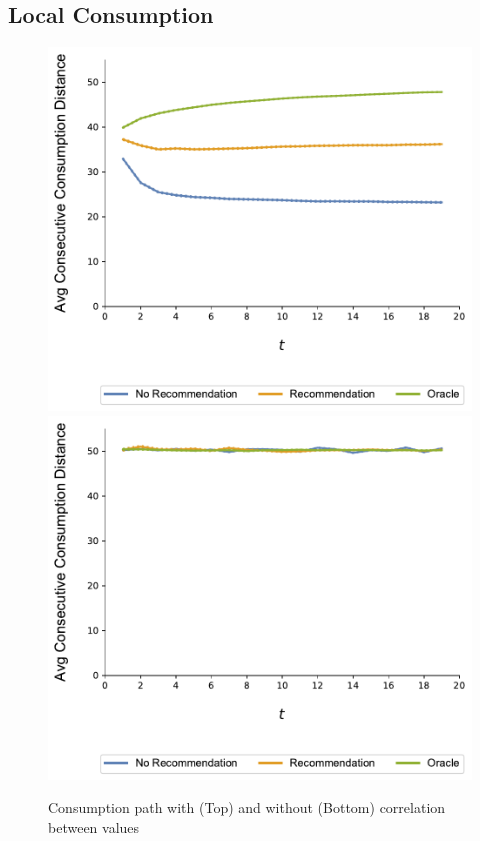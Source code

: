 \documentclass[sigconf]{acmart}
\begin{document}
\subsection{Local Consumption}
\begin{figure}
\includegraphics[width=.9\linewidth]{figures/rho_pos_consumption_dist_N_200T_20_overall.pdf}\\
\includegraphics[width=.9\linewidth]{figures/rho_zero_consumption_dist_N_200T_20_overall.pdf}\\
\caption{Consumption path with (Top) and without (Bottom) correlation between values}
\label{fig:correlation_consumption_path}
\end{figure}
\end{document}
